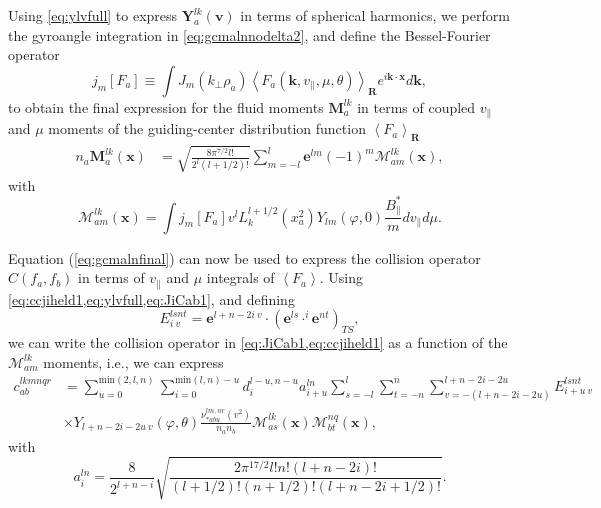 Using \cref{eq:ylvfull} to express $\mathbf Y_a^{lk}(\mathbf v)$ in terms of spherical harmonics, we perform the gyroangle integration in \cref{eq:gcmalnnodelta2}, and define the Bessel-Fourier operator
%
\begin{equation}
     j_m[F_a]\equiv \int J_m(k_\perp \rho_a)\left<F_a(\mathbf k, v_\parallel, \mu,\theta)\right>_{\mathbf R}  e^{i \mathbf k \cdot \mathbf x}d \mathbf k,
\label{eq:fourierbessel}
\end{equation}
%
to obtain the final expression for the fluid moments $\mathbf M_a^{lk}$ in terms of coupled $v_\parallel$ and $\mu$ moments of the guiding-center distribution function $\left<F_a\right>_{\mathbf R}$
%
\begin{equation}
\begin{split}
    n_a \mathbf M_a^{lk}(\mathbf x)&= \sqrt{\frac{8\pi^{7/2}l!}{2^l(l+1/2)!}}\sum_{m=-l}^{l} \mathbf e^{l m}(-1)^m \mathcal{M}^{lk}_{am}(\mathbf x),
\end{split}
\label{eq:gcmalnfinal}
\end{equation}
%
with
%
\begin{equation}
    \mathcal{M}^{lk}_{am}(\mathbf x)=\int j_m[F_a] v^l L_k^{l+1/2}(x_a^2) Y_{lm}(\varphi,0)
     \frac{B_{\parallel}^*}{m} dv_\parallel d\mu.
\end{equation}

Equation (\ref{eq:gcmalnfinal}) can now be used to express the collision operator $C(f_a,f_b)$ in terms of $v_\parallel$ and $\mu$ integrals of $\left< F_a \right>$.
%
Using \cref{eq:ccjiheld1,eq:ylvfull,eq:JiCab1}, and defining
%
\begin{equation}
    E_{i~v}^{ls nt} = \mathbf e^{l+n-2i~v}\cdot ({\mathbf e^{ls}\cdot^{i}\mathbf e^{nt}})_{TS},
\end{equation}
%
we can write the collision operator in \cref{eq:JiCab1,eq:ccjiheld1} as a function of the $\mathcal{M}^{lk}_{am}$ moments, i.e., we can express
%
\begin{equation}
\begin{split}
    c^{lkmnqr}_{ab}&=\sum_{u=0}^{\text{min}(2,l,n)}\sum_{i=0}^{\text{min}(l,n)-u}d_i^{l-u,n-u}a^{ln}_{i+u}\sum_{s=-l}^l\sum_{t=-n}^n\sum_{v=-(l+n-2i-2u)}^{l+n-2i-2u} E^{ls nt}_{i+u~v}\\
    &\times  Y_{l+n-2i-2u~v}(\varphi,\theta)\frac{\nu_{*abu}^{lm,nr}(v^2)}{n_a n_b} \mathcal{M}^{lk}_{as}(\mathbf x)\mathcal{M}^{nq}_{bt}(\mathbf x),
\end{split}
    \label{eq:ccgc}
\end{equation}
%
with
%
\begin{equation}
    a^{ln}_{i}=\frac{8}{2^{l+n-i}}\sqrt{\frac{2 \pi^{17/2}l!n!(l+n-2i)!}{(l+1/2)!(n+1/2)!(l+n-2i+1/2)!}}.
\end{equation}
%

